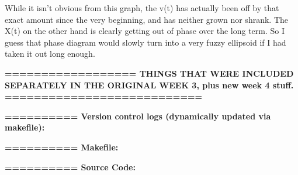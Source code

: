 \documentclass{article}
\begin{document}
While it isn't obvious from this graph, the v(t) has actually been off by that exact amount since the very beginning, and has neither grown nor shrank. The X(t) on the other hand is clearly getting out of phase over the long term. So I guess that phase diagram would slowly turn into a very fuzzy ellipsoid if I had taken it out long enough.

\bigskip


\textbf{ ================== THINGS THAT WERE INCLUDED SEPARATELY IN THE ORIGINAL WEEK 3, plus new week 4 stuff.  ===========================}

\bigskip

\textbf{\huge ========== Version control logs (dynamically updated via makefile):}



\textbf{\huge ========== Makefile:}



\textbf{\huge ========== Source Code:}


\end{document}
